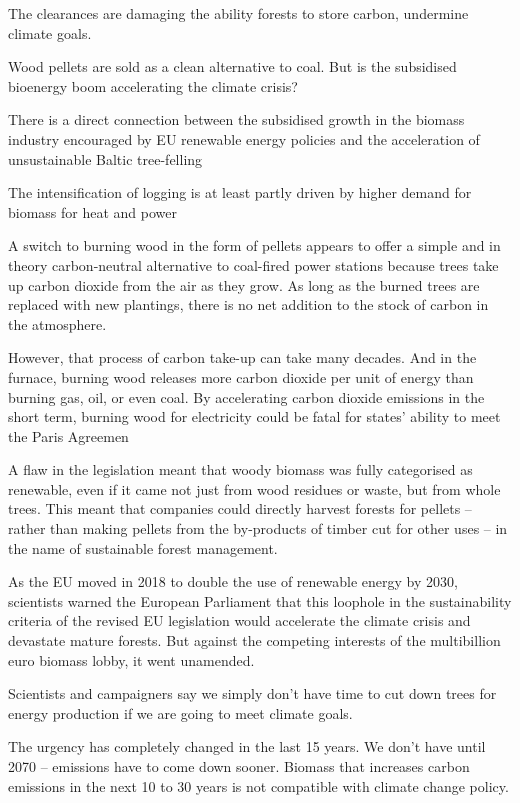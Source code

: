 \documentclass[
]{book}
\begin{document}
The clearances are damaging the ability forests to store carbon,
undermine climate goals.

Wood pellets are sold as a clean alternative to coal. But is the subsidised bioenergy boom accelerating the climate crisis?

There is a direct connection between the subsidised growth in the biomass industry encouraged by EU renewable energy policies and the acceleration of unsustainable Baltic tree-felling

The intensification of logging is at least partly driven by higher demand for biomass for heat and power

A switch to burning wood in the form of pellets appears to offer a simple and in theory carbon-neutral alternative to coal-fired power stations because trees take up carbon dioxide from the air as they grow. As long as the burned trees are replaced with new plantings, there is no net addition to the stock of carbon in the atmosphere.

However, that process of carbon take-up can take many decades. And in the furnace, burning wood releases more carbon dioxide per unit of energy than burning gas, oil, or even coal. By accelerating carbon dioxide emissions in the short term, burning wood for electricity could be fatal for states' ability to meet the Paris Agreemen

A flaw in the legislation meant that woody biomass was fully categorised as renewable, even if it came not just from wood residues or waste, but from whole trees. This meant that companies could directly harvest forests for pellets -- rather than making pellets from the by-products of timber cut for other uses -- in the name of sustainable forest management.

As the EU moved in 2018 to double the use of renewable energy by 2030, scientists warned the European Parliament that this loophole in the sustainability criteria of the revised EU legislation would accelerate the climate crisis and devastate mature forests. But against the competing interests of the multibillion euro biomass lobby, it went unamended.

Scientists and campaigners say we simply don't have time to cut down trees for energy production if we are going to meet climate goals.

The urgency has completely changed in the last 15 years.
We don't have until 2070 -- emissions have to come down sooner.
Biomass that increases carbon emissions in the next 10 to 30 years
is not compatible with climate change policy.
\end{document}
